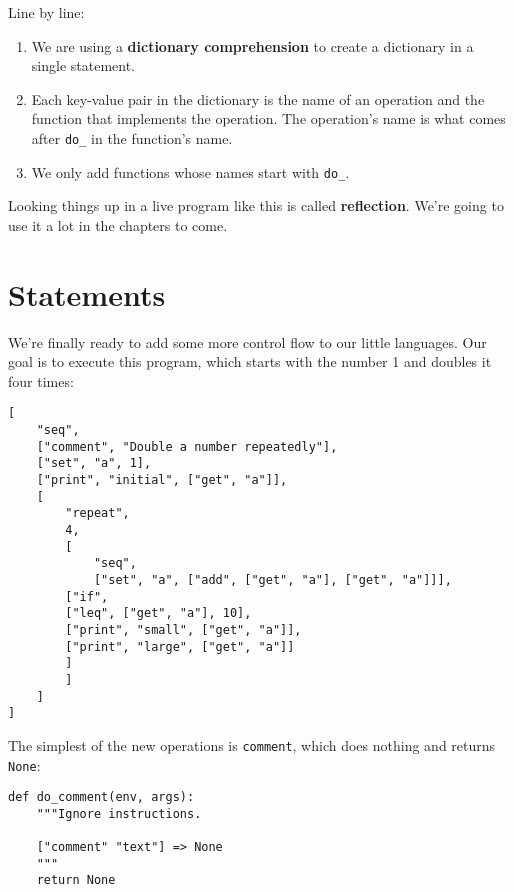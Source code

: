 \documentclass{scrbook}
\newcommand{\glossref}[1]{\textbf{#1}}
\begin{document}
\noindent Line by line:

\begin{enumerate}

\item 

We are using a \glossref{dictionary comprehension}
    to create a dictionary in a single statement.



\item 

Each key-value pair in the dictionary is the name of an operation
    and the function that implements the operation.
    The operation's name is what comes after \texttt{do\_} in the function's name.



\item 

We only add functions whose names start with \texttt{do\_}.



\end{enumerate}


Looking things up in a live program like this is called \glossref{reflection}.
We're going to use it a lot in the chapters to come.

\section{Statements}\label{interpreter-statements}


We're finally ready to add some more control flow to our little languages.
Our goal is to execute this program,
which starts with the number 1 and doubles it four times:


\begin{lstlisting}[frame=single,frameround=tttt]
[
    "seq",
    ["comment", "Double a number repeatedly"],
    ["set", "a", 1],
    ["print", "initial", ["get", "a"]],
    [
        "repeat",
        4,
        [
            "seq",
            ["set", "a", ["add", ["get", "a"], ["get", "a"]]],
        ["if",
        ["leq", ["get", "a"], 10],
        ["print", "small", ["get", "a"]],
        ["print", "large", ["get", "a"]]
        ]
        ]
    ]
]
\end{lstlisting}



The simplest of the new operations is \texttt{comment},
which does nothing and returns \texttt{None}:


\begin{lstlisting}[frame=single,frameround=tttt]
def do_comment(env, args):
    """Ignore instructions.

    ["comment" "text"] => None
    """
    return None
\end{lstlisting}
\end{document}

